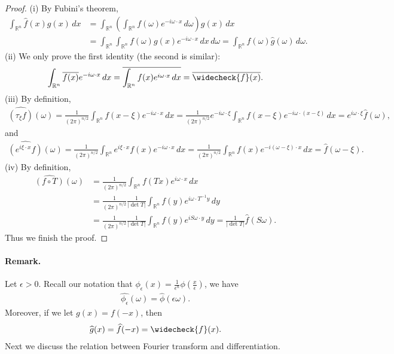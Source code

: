 \documentclass{article}
\numberwithin{equation}{section}
\newcommand{\bbR}{\mathbb{R}}
\newcommand{\ol}{\overline}
\newcommand{\wh}{\widehat}
\theoremstyle{plain}
\theoremstyle{definition}
\begin{document}
\begin{proof}
(i) By Fubini's theorem,
\begin{align*}
	\int_{\bbR^n}\wh{f}(x)g(x)\,dx&=\int_{\bbR^n}\left(\int_{\bbR^n}f(\omega)e^{-i\omega\cdot x}\,d\omega\right)g(x)\,dx\\
	&=\int_{\bbR^n}\int_{\bbR^n}f(\omega)g(x)e^{-i\omega\cdot x}\,dx\,d\omega=\int_{\bbR^n}f(\omega)\wh{g}(\omega)\,d\omega.
\end{align*}
(ii) We only prove the first identity (the second is similar):
\begin{align*}
	\int_{\bbR^n}\ol{f(x)}e^{-i\omega\cdot x}\,dx=\ol{\int_{\bbR^n}f(x)e^{i\omega\cdot x}\,dx}=\ol{\widecheck{f}(x)}.
\end{align*}
(iii) By definition,
\begin{align*}
	\wh{(\tau_\xi f)}(\omega)=\frac{1}{(2\pi)^{n/2}}\int_{\bbR^n}f(x-\xi)e^{-i\omega\cdot x}\,dx=\frac{1}{(2\pi)^{n/2}}e^{-i\omega\cdot\xi}\int_{\bbR^n}f(x-\xi)e^{-i\omega\cdot (x-\xi)}\,dx=e^{i\omega\cdot\xi}\wh{f}(\omega),
\end{align*}
and
\begin{align*}
	\wh{(e^{i\xi\cdot x}f)}(\omega)=\frac{1}{(2\pi)^{n/2}}\int_{\bbR^n}e^{i\xi\cdot x}f(x)e^{-i\omega\cdot x}\,dx=\frac{1}{(2\pi)^{n/2}}\int_{\bbR^n}f(x)e^{-i(\omega-\xi)\cdot x}\,dx=\wh{f}(\omega-\xi).
\end{align*}
(iv) By definition,
\begin{align*}
	\wh{(f\circ T)}(\omega)&=\frac{1}{(2\pi)^{n/2}}\int_{\bbR^n}f(Tx)e^{i\omega\cdot x}\,dx\\
	&=\frac{1}{(2\pi)^{n/2}}\frac{1}{\left\vert\det T\right\vert}\int_{\bbR^n}f(y)e^{i\omega\cdot T^{-1}y}\,dy\\
	&=\frac{1}{(2\pi)^{n/2}}\frac{1}{\left\vert\det T\right\vert}\int_{\bbR^n}f(y)e^{iS\omega\cdot y}\,dy=\frac{1}{\left\vert\det T\right\vert}\wh{f}(S\omega).
\end{align*}
Thus we finish the proof.
\end{proof}
\paragraph{Remark.} Let $\epsilon>0$. Recall our notation that $\phi_\epsilon(x)=\frac{1}{\epsilon^n}\phi(\frac{x}{\epsilon})$, we have
\begin{align*}
	\wh{\phi_\epsilon}(\omega)=\wh{\phi}(\epsilon\omega).
\end{align*}
Moreover, if we let $g(x)=f(-x)$, then
\begin{align*}
	\wh{g}(x)=\wh{f}(-x)=\widecheck{f}(x).
\end{align*}
Next we discuss the relation between Fourier transform and differentiation.
\end{document}
